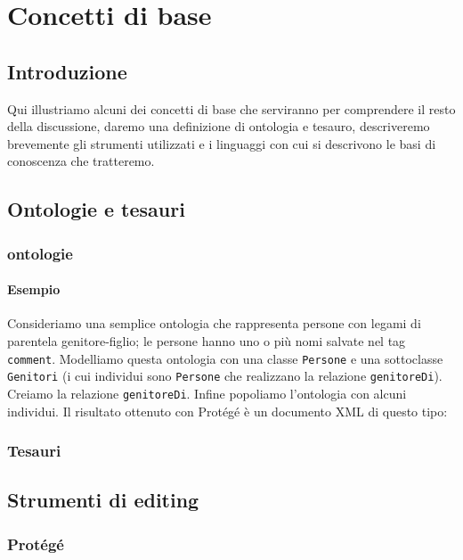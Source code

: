 \chapter{Concetti di base}

\section*{Introduzione}
Qui illustriamo alcuni dei concetti di base che serviranno per comprendere il resto della discussione, daremo una definizione di ontologia e tesauro, descriveremo brevemente gli strumenti utilizzati e i linguaggi con cui si descrivono le basi di conoscenza che tratteremo.


\section{Ontologie e tesauri}

\subsection{ontologie}
\subsubsection{Esempio}
Consideriamo una semplice ontologia che rappresenta persone con legami di parentela genitore-figlio; le persone hanno uno o più nomi salvate nel tag \verb|comment|. Modelliamo questa ontologia con una classe \verb|Persone| e una sottoclasse \verb|Genitori| (i cui individui sono \verb|Persone| che realizzano la relazione \verb|genitoreDi|). Creiamo la relazione \verb|genitoreDi|. Infine popoliamo l'ontologia con alcuni individui. Il risultato ottenuto con Protégé è un documento XML di questo tipo:

\subsection{Tesauri}

\section{Strumenti di editing}

\subsection{Protégé}

